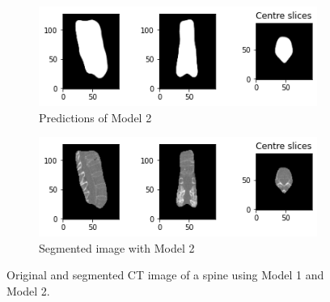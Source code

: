 \begin{figure}[ht!]
\begin{subfigure}[b]{0.7\textwidth}
   \includegraphics[width=1\linewidth]{images/results_2/dice_mask.png}
   \caption{Predictions of Model 2}
   \label{fig:Ng4}
\end{subfigure}

\begin{subfigure}[b]{0.7\textwidth}
   \includegraphics[width=1\linewidth]{images/results_2/dice_segmented.png}
   \caption{Segmented image with Model 2}
   \label{fig:Ng5}
\end{subfigure}

\caption[Results of spine segmentation]{Original and segmented CT image of a spine using Model 1 and Model 2.}
\label{fig:spine-segmentations-1}
\end{figure}


